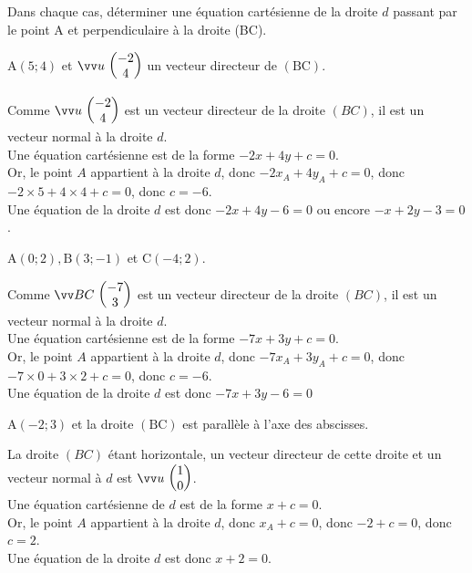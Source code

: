 \documentclass[12pt,a4paper]{article}  %
\begin{document}
\newpage
{}
Dans chaque cas, déterminer une équation cartésienne de la droite $d$ passant par le point $\mathrm{A}$ et perpendiculaire à la droite (BC).
\begin{enumMet}
    \item {} $\mathrm{A}(5 ; 4)$ et $\Coord{u}{-2}{4}$ un vecteur directeur de $(\mathrm{BC})$.\\
    \begin{corrBox}
        Comme $\Coord{u}{-2}{4}$ est un vecteur directeur de la droite $(B C)$, il est un vecteur normal à la droite $d$.\\
        Une équation cartésienne est de la forme $-2x+4 y+c=0$.\\
        Or, le point $A$ appartient à la droite $d$, donc $-2x_{A}+4y_{A}+c=0$, donc $-2 \times 5+4 \times 4+c=0$, donc $c=-6$.\\
        Une équation de la droite $d$ est donc $-2 x+4 y-6=0$ ou encore $-x+2y-3=0$.
    \end{corrBox}
    \item $\mathrm{A}(0 ; 2), \mathrm{B}(3 ;-1)$ et $\mathrm{C}(-4 ; 2)$.\\
    \begin{corrBox}
        Comme $\Coord{BC}{-7}{3}$  est un vecteur directeur de la droite $(B C)$, il est un vecteur normal à la droite $d$.\\
        Une équation cartésienne est de la forme $-7 x+3y+c=0$.\\
        Or, le point $A$ appartient à la droite $d$, donc $-7 x_{A}+3y_{A}+c=0$, donc $-7 \times 0+3 \times 2+c=0$, donc $c=-6$.\\
        Une équation de la droite $d$ est donc $-7 x+3 y-6=0$        
    \end{corrBox}
    \item $\mathrm{A}(-2 ; 3)$ et la droite $(\mathrm{BC})$ est parallèle à l'axe des abscisses.\\
    \begin{corrBox}
        La droite $(B C)$ étant horizontale, un vecteur directeur de cette droite et un vecteur normal à $d$ est $\Coord{u}{1}{0}$.\\
        Une équation cartésienne de $d$ est de la forme $x+c=0$.\\
        Or, le point $A$ appartient à la droite $d$, donc $x_{A}+c=0$, donc $-2+c=0$, donc $c=2$.\\
        Une équation de la droite $d$ est donc $x+2=0$.        
    \end{corrBox}
\end{enumMet}
\end{document}

